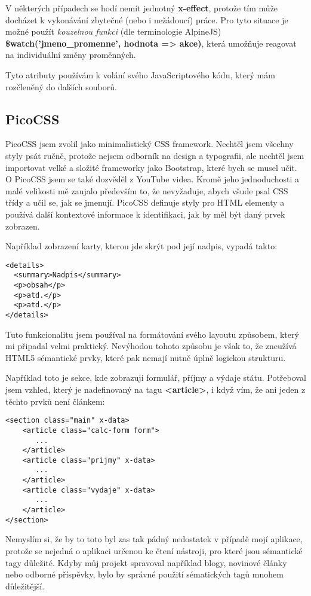 \documentclass[11pt,a4paper,twoside,openright]{report}
\begin{document}
V některých případech se hodí nemít jednotný \textbf{x-effect}, protože tím může docházet k vykonávání
zbytečné (nebo i nežádoucí) práce. Pro tyto situace je možné použít \emph{kouzelnou funkci} (dle terminologie
AlpineJS) \textbf{\$watch('jmeno\_promenne', hodnota => akce)}, která umožňuje reagovat na individuální
změny proměnných.

Tyto atributy používám k volání svého JavaScriptového kódu, který mám rozčleněný do dalších souborů.

\subsection{PicoCSS}

PicoCSS jsem zvolil jako minimalistický CSS framework. Nechtěl jsem všechny styly psát ručně, protože
nejsem odborník na design a typografii, ale nechtěl jsem importovat velké a složité frameworky jako
Bootstrap, které bych se musel učit. O PicoCSS jsem se také dozvěděl z YouTube videa. Kromě jeho jednoduchosti
a malé velikosti mě zaujalo především to, že nevyžaduje, abych všude psal CSS třídy a učil se, jak se
jmenují. PicoCSS definuje styly pro HTML elementy a používá další kontextové informace k identifikaci,
jak by měl být daný prvek zobrazen.

Například zobrazení karty, kterou jde skrýt pod její nadpis, vypadá takto:

\begin{verbatim}
<details>
  <summary>Nadpis</summary>
  <p>obsah</p>
  <p>atd.</p>
  <p>atd.</p>
</details>
\end{verbatim}

Tuto funkcionalitu jsem používal na formátování svého layoutu způsobem, který mi připadal velmi praktický.
Nevýhodou tohoto způsobu je však to, že zneužívá HTML5 sémantické prvky, které pak nemají nutně úplně logickou
strukturu.

Například toto je sekce, kde zobrazuji formulář, příjmy a výdaje státu. Potřeboval jsem vzhled, který
je nadefinovaný na tagu \textbf{<article>}, i když vím, že ani jeden z těchto prvků není článkem:

\begin{verbatim}
<section class="main" x-data>
    <article class="calc-form form">
       ...
    </article>
    <article class="prijmy" x-data>
       ...
    </article>
    <article class="vydaje" x-data>
       ...
    </article>
</section>
\end{verbatim}

Nemyslím si, že by to toto byl zas tak pádný nedostatek v případě mojí aplikace, protože se nejedná o
aplikaci určenou ke čtení nástroji, pro které jsou sémantické tagy důležité. Kdyby můj projekt spravoval
například blogy, novinové články nebo odborné příspěvky, bylo by správné použití sématických tagů
mnohem důležitější.
\end{document}
